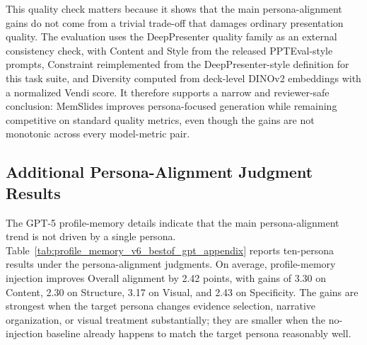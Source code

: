 \documentclass{llmxive}
\begin{document}
This quality check matters because it shows that the main persona-alignment
gains do not come from a trivial trade-off that damages ordinary presentation
quality. The evaluation uses the DeepPresenter quality family as an external
consistency check, with Content and Style from the released PPTEval-style
prompts, Constraint reimplemented from the DeepPresenter-style definition for
this task suite, and Diversity computed from deck-level DINOv2 embeddings with a
normalized Vendi score. It therefore supports a narrow and reviewer-safe
conclusion: MemSlides improves persona-focused generation while remaining
competitive on standard quality metrics, even though the gains are not monotonic
across every model-metric pair.

\subsection{Additional Persona-Alignment Judgment Results}

The GPT-5 profile-memory details indicate that the main persona-alignment trend is
not driven by a single persona. Table~\ref{tab:profile_memory_v6_bestof_gpt_appendix}
reports ten-persona results under the persona-alignment judgments. On
average, profile-memory injection improves Overall alignment by 2.42 points,
with gains of 3.30 on Content, 2.30 on Structure, 3.17 on Visual, and 2.43 on
Specificity. The gains are strongest when the target persona changes evidence
selection, narrative organization, or visual treatment substantially; they are
smaller when the no-injection baseline already happens to match the target
persona reasonably well.
\end{document}
